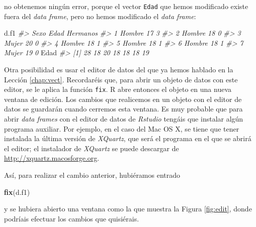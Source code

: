 \documentclass[
]{book}
\newenvironment{Shaded}{\begin{snugshade}}{\end{snugshade}}
\newcommand{\CommentTok}[1]{\textcolor[rgb]{0.56,0.35,0.01}{\textit{#1}}}
\newcommand{\KeywordTok}[1]{\textcolor[rgb]{0.13,0.29,0.53}{\textbf{#1}}}
\newcommand{\NormalTok}[1]{#1}
\theoremstyle{definition}
\theoremstyle{definition}
\theoremstyle{definition}
\theoremstyle{remark}
\begin{document}
no obtenemos ningún error, porque el vector \texttt{Edad} que hemos modificado existe fuera del \emph{data frame}, pero no hemos modificado el \emph{data frame}:

\begin{Shaded}
\begin{Highlighting}[]
\NormalTok{d.f1}
\CommentTok{\#\textgreater{}     Sexo Edad Hermanos}
\CommentTok{\#\textgreater{} 1 Hombre   17        3}
\CommentTok{\#\textgreater{} 2 Hombre   18        0}
\CommentTok{\#\textgreater{} 3  Mujer   20        0}
\CommentTok{\#\textgreater{} 4 Hombre   18        1}
\CommentTok{\#\textgreater{} 5 Hombre   18        1}
\CommentTok{\#\textgreater{} 6 Hombre   18        1}
\CommentTok{\#\textgreater{} 7  Mujer   19        0}
\NormalTok{Edad}
\CommentTok{\#\textgreater{} [1] 28 18 20 18 18 18 19}
\end{Highlighting}
\end{Shaded}

Otra posibilidad es usar el editor de datos del que ya hemos hablado en la Lección \ref{chap:vect}. Recordaréis que, para abrir un objeto de datos con este editor, se le aplica la función \texttt{fix}. R abre entonces el objeto en una nueva ventana de edición. Los cambios que realicemos en un objeto con el editor de datos se guardarán cuando cerremos esta ventana. Es muy probable que para abrir \emph{data frames} con el editor de datos de \emph{Rstudio} tengáis que instalar algún programa auxiliar. Por ejemplo, en el caso del Mac OS X, se tiene que tener instalada la última versión de \emph{XQuartz}, que será el programa en el que se abrirá el editor; el instalador de \emph{XQuartz} se puede descargar de \url{http://xquartz.macosforge.org}.

Así, para realizar el cambio anterior, hubiéramos entrado

\begin{Shaded}
\begin{Highlighting}[]
\KeywordTok{fix}\NormalTok{(d.f1)}
\end{Highlighting}
\end{Shaded}

y se hubiera abierto una ventana como la que muestra la Figura \ref{fig:edit}, donde podríais efectuar los cambios que quisiérais.
\end{document}
